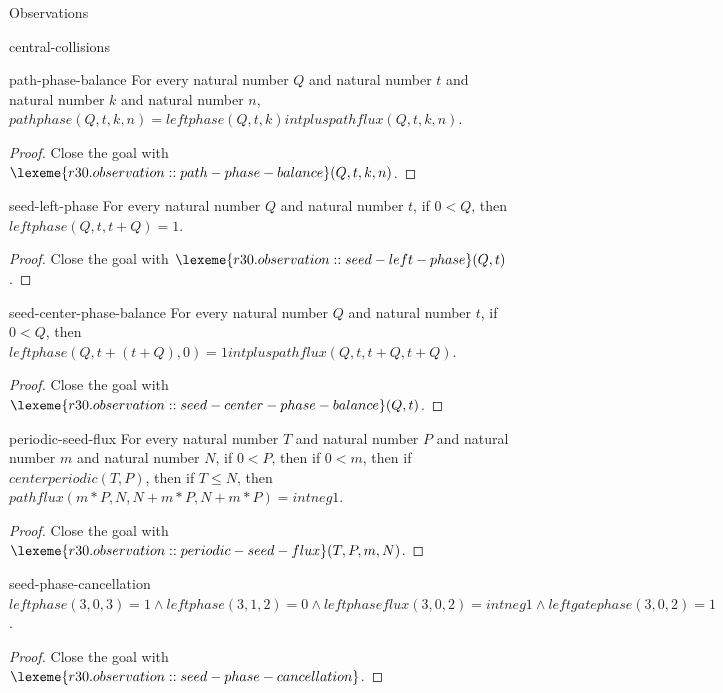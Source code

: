 \begin{lexlean}{Observations}
\begin{section}{central-collisions}
\begin{theorem}{path-phase-balance}
For every natural number \(Q\) and natural number \(t\) and natural number \(k\) and natural number \(n\), \(pathphase(Q, t, k, n) = leftphase(Q, t, k) intplus pathflux(Q, t, k, n)\).
\begin{proof}
Close the goal with \(\lexeme{r30.observation::path-phase-balance}(Q, t, k, n)\).
\end{proof}
\end{theorem}

\begin{theorem}{seed-left-phase}
For every natural number \(Q\) and natural number \(t\), if \(0 < Q\), then \(leftphase(Q, t, t + Q) = 1\).
\begin{proof}
Close the goal with \(\lexeme{r30.observation::seed-left-phase}(Q, t)\).
\end{proof}
\end{theorem}

\begin{theorem}{seed-center-phase-balance}
For every natural number \(Q\) and natural number \(t\), if \(0 < Q\), then \(leftphase(Q, t + (t + Q), 0) = 1 intplus pathflux(Q, t, t + Q, t + Q)\).
\begin{proof}
Close the goal with \(\lexeme{r30.observation::seed-center-phase-balance}(Q, t)\).
\end{proof}
\end{theorem}

\begin{theorem}{periodic-seed-flux}
For every natural number \(T\) and natural number \(P\) and natural number \(m\) and natural number \(N\), if \(0 < P\), then if \(0 < m\), then if \(centerperiodic(T, P)\), then if \(T ≤ N\), then \(pathflux(m * P, N, N + m * P, N + m * P) = intneg 1\).
\begin{proof}
Close the goal with \(\lexeme{r30.observation::periodic-seed-flux}(T, P, m, N)\).
\end{proof}
\end{theorem}

\begin{theorem}{seed-phase-cancellation}
\(leftphase(3, 0, 3) = 1 ∧ leftphase(3, 1, 2) = 0 ∧ leftphaseflux(3, 0, 2) = intneg 1 ∧ leftgatephase(3, 0, 2) = 1\).
\begin{proof}
Close the goal with \(\lexeme{r30.observation::seed-phase-cancellation}\).
\end{proof}
\end{theorem}


\end{section}
\end{lexlean}

